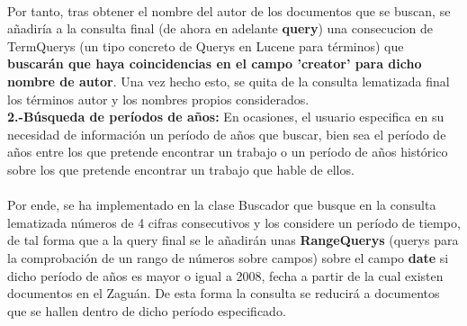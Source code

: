 \documentclass[a4paper]{article}
\begin{document}
\begin{itemize}
	\paragraph{}Por tanto, tras obtener el nombre del autor de los documentos que se buscan, se añadiría a la consulta final (de ahora en adelante \textbf{query}) una consecucion de TermQuerys (un tipo concreto de Querys en Lucene para términos) que \textbf{buscarán que haya coincidencias en el campo 'creator' para dicho nombre de autor}.
	Una vez hecho esto, se quita de la consulta lematizada final los términos autor y los nombres propios considerados.
	\\
	\newpage\textbf{2.-Búsqueda de períodos de años:} En ocasiones, el usuario especifica en su necesidad de información un período de años que buscar, bien sea el período de años entre los que pretende encontrar un trabajo o un período de años histórico sobre los que pretende encontrar un trabajo que hable de ellos.
	\paragraph{}Por ende, se ha implementado en la clase Buscador que busque en la consulta lematizada números de 4 cifras consecutivos y los considere un período de tiempo, de tal forma que a la query final se le añadirán unas \textbf{RangeQuerys} (querys para la comprobación de un rango de números sobre campos) sobre el campo \textbf{date} si dicho período de años es mayor o igual a 2008, fecha a partir de la cual existen documentos en el Zaguán. De esta forma la consulta se reducirá a documentos que se hallen dentro de dicho período especificado.

\end{itemize}
\end{document}

